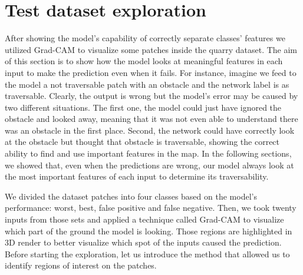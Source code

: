 \documentclass[../document.tex]{subfiles}
\begin{document}
\section{Test dataset exploration}
\label{sec: quarry-dataset}
After showing the model's capability of correctly separate classes' features we utilized Grad-CAM to visualize some patches inside the quarry dataset. The aim of this section is to show how the model looks at meaningful features in each input to make the prediction even when it fails. For instance, imagine we feed to the model a not traversable patch with an obstacle and the network label is as traversable. Clearly, the output is wrong but the model's error may be caused by two different situations. The first one, the model could just have ignored the obstacle and looked away, meaning that it was not even able to understand there was an obstacle in the first place. Second, the network could have correctly look at the obstacle but thought that obstacle is traversable, showing the correct ability to find and use important features in the map. In the following sections, we showed that, even when the predictions are wrong, our model always look at the most important features of each input to determine its traversability. 

We divided the dataset patches into four classes based on the model's performance: worst, best, false positive and false negative. Then, we took twenty inputs from those sets and applied a technique called Grad-CAM to visualize which part of the ground the model is looking. Those regions are highlighted in 3D render to better visualize which spot of the inputs caused the prediction. Before starting the exploration, let us introduce the method that allowed us to identify regions of interest on the patches. 
\end{document}
